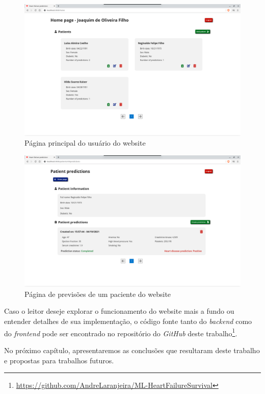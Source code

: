 \begin{figure}[ht!]
  \centering
  \includegraphics[scale=0.26]{images/website_pagina_home.png}
  \caption{Página principal do usuário do website}
  \label{fig:website_home_page}
\end{figure}

\begin{figure}[ht!]
  \centering
  \includegraphics[scale=0.26]{images/website_pagina_previsoes_paciente.png}
  \caption{Página de previsões de um paciente do website}
  \label{fig:website_patient_predictions_page}
\end{figure}

Caso o leitor deseje explorar o funcionamento do website mais a fundo ou entender detalhes de sua implementação, o código fonte tanto do \textit{backend} como do \textit{frontend} pode ser encontrado no repositório do \textit{GitHub} deste trabalho\footnote{\url{https://github.com/AndreLaranjeira/ML-HeartFailureSurvival}}.

No próximo capítulo, apresentaremos as conclusões que resultaram deste trabalho e propostas para trabalhos futuros.
